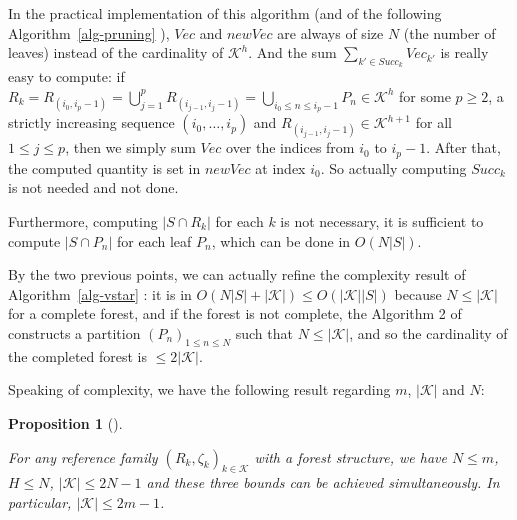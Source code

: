 \documentclass[
  11pt,
  a4paper,
]{article}
\theoremstyle{plain}
\theoremstyle{definition}
\theoremstyle{plain}
\theoremstyle{definition}
\theoremstyle{plain}
\newtheorem{proposition}{Proposition}[section]
\theoremstyle{remark}
\newcounter{quartocallouttipno}
\newcommand{\quartocallouttip}[1]{\refstepcounter{quartocallouttipno}\label{#1}}
\begin{document}
\begin{tcolorbox}[enhanced jigsaw, leftrule=.75mm, bottomtitle=1mm, left=2mm, coltitle=black, bottomrule=.15mm, opacityback=0, colbacktitle=quarto-callout-tip-color!10!white, breakable, titlerule=0mm, colframe=quarto-callout-tip-color-frame, colback=white, arc=.35mm, toptitle=1mm, rightrule=.15mm, opacitybacktitle=0.6, title=\textcolor{quarto-callout-tip-color}{\faLightbulb}\hspace{0.5em}{Tip \ref*{tip-algo1} }, toprule=.15mm]

\quartocallouttip{tip-algo1} 

In the practical implementation of this algorithm (and of the following
 Algorithm~\ref{alg-pruning} ), \(Vec\) and \(newVec\) are always of
size \(N\) (the number of leaves) instead of the cardinality of
\(\mathcal{K}^h\). And the sum \(\sum_{k'\in Succ_k} Vec_{k'}\) is
really easy to compute: if
\(R_k= R_{(i_0,i_{p}-1)}= \bigcup_{ j=1}^{p} R_{(i_{ j-1}, i_{ j}-1)}=\bigcup_{i_0\leq n\leq i_{p}-1}P_n\in\mathcal{K}^h\)
for some \(p\geq2\), a strictly increasing sequence
\((i_0,\dotsc,i_{p})\) and
\(R_{(i_{ j-1}, i_{ j}-1)}\in\mathcal{K}^{h+1}\) for all
\(1\leq j\leq p\), then we simply sum \(Vec\) over the indices from
\(i_{0}\) to \(i_{p}-1\). After that, the computed quantity is set in
\(newVec\) at index \(i_0\). So actually computing \(Succ_k\) is not
needed and not done.

Furthermore, computing \(|S\cap R_k|\) for each \(k\) is not necessary,
it is sufficient to compute \(|S\cap P_n|\) for each leaf \(P_n\), which
can be done in \(O(N|S|)\).

By the two previous points, we can actually refine the complexity result
of  Algorithm~\ref{alg-vstar} : it is in
\(O(N|S|+|\mathcal{K}|)\leq O(|\mathcal{K}||S|)\) because
\(N\leq|\mathcal{K}|\) for a complete forest, and if the forest is not
complete, the Algorithm 2 of \citet{MR4178188} constructs a partition
\((P_n)_{1\leq n\leq N}\) such that \(N\leq|\mathcal{K}|\), and so the
cardinality of the completed forest is \(\leq 2|\mathcal{K}|\).

\end{tcolorbox}

Speaking of complexity, we have the following result regarding \(m\),
\(|\mathcal{K}|\) and \(N\):

\begin{proposition}[]\protect\hypertarget{prp-cardinals}{}\label{prp-cardinals}

For any reference family \((R_k,\zeta_k)_{k\in\mathcal{K}}\) with a
forest structure, we have \(N\leq m\), \(H\leq N\),
\(|\mathcal{K}|\leq 2N-1\) and these three bounds can be achieved
simultaneously. In particular, \(|\mathcal{K}|\leq 2m-1\).

\end{proposition}
\end{document}
